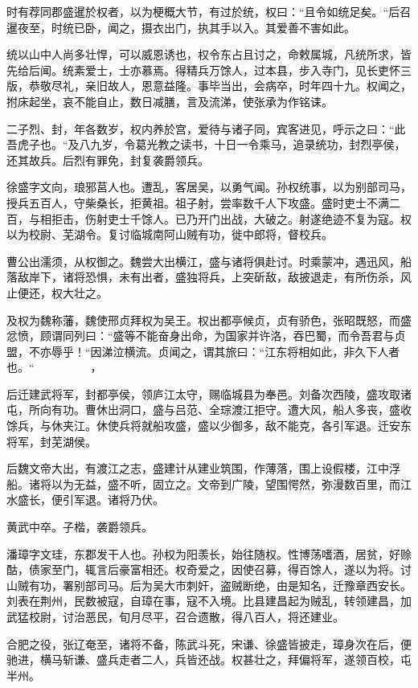 \documentclass[12pt,UTF8]{ctexbook}
\begin{document}
时有荐同郡盛暹於权者，以为梗概大节，有过於统，权曰：“且令如统足矣。“后召暹夜至，时统已卧，闻之，摄衣出门，执其手以入。其爱善不害如此。

统以山中人尚多壮悍，可以威恩诱也，权令东占且讨之，命敕属城，凡统所求，皆先给后闻。统素爱士，士亦慕焉。得精兵万馀人，过本县，步入寺门，见长吏怀三版，恭敬尽礼，亲旧故人，恩意益隆。事毕当出，会病卒，时年四十九。权闻之，拊床起坐，哀不能自止，数日减膳，言及流涕，使张承为作铭诔。

二子烈、封，年各数岁，权内养於宫，爱待与诸子同，宾客进见，呼示之曰：“此吾虎子也。“及八九岁，令葛光教之读书，十日一令乘马，追录统功，封烈亭侯，还其故兵。后烈有罪免，封复袭爵领兵。

徐盛字文向，琅邪莒人也。遭乱，客居吴，以勇气闻。孙权统事，以为别部司马，授兵五百人，守柴桑长，拒黄祖。祖子射，尝率数千人下攻盛。盛时吏士不满二百，与相拒击，伤射吏士千馀人。已乃开门出战，大破之。射遂绝迹不复为寇。权以为校尉、芜湖令。复讨临城南阿山贼有功，徙中郎将，督校兵。

曹公出濡须，从权御之。魏尝大出横江，盛与诸将俱赴讨。时乘蒙冲，遇迅风，船落敌岸下，诸将恐惧，未有出者，盛独将兵，上突斫敌，敌披退走，有所伤杀，风止便还，权大壮之。

及权为魏称藩，魏使邢贞拜权为吴王。权出都亭候贞，贞有骄色，张昭既怒，而盛忿愤，顾谓同列曰：“盛等不能奋身出命，为国家并许洛，吞巴蜀，而令吾君与贞盟，不亦辱乎！“因涕泣横流。贞闻之，谓其旅曰：“江东将相如此，非久下人者也。“　　　　　，

后迁建武将军，封都亭侯，领庐江太守，赐临城县为奉邑。刘备次西陵，盛攻取诸屯，所向有功。曹休出洞口，盛与吕范、全琮渡江拒守。遭大风，船人多丧，盛收馀兵，与休夹江。休使兵将就船攻盛，盛以少御多，敌不能克，各引军退。迁安东将军，封芜湖侯。

后魏文帝大出，有渡江之志，盛建计从建业筑围，作薄落，围上设假楼，江中浮船。诸将以为无益，盛不听，固立之。文帝到广陵，望围愕然，弥漫数百里，而江水盛长，便引军退。诸将乃伏。

黄武中卒。子楷，袭爵领兵。

潘璋字文珪，东郡发干人也。孙权为阳羡长，始往随权。性博荡嗜酒，居贫，好赊酤，债家至门，辄言后豪富相还。权奇爱之，因使召募，得百馀人，遂以为将。讨山贼有功，署别部司马。后为吴大巿刺奸，盗贼断绝，由是知名，迁豫章西安长。刘表在荆州，民数被寇，自璋在事，寇不入境。比县建昌起为贼乱，转领建昌，加武猛校尉，讨治恶民，旬月尽平，召合遗散，得八百人，将还建业。

合肥之役，张辽奄至，诸将不备，陈武斗死，宋谦、徐盛皆披走，璋身次在后，便驰进，横马斩谦、盛兵走者二人，兵皆还战。权甚壮之，拜偏将军，遂领百校，屯半州。
\end{document}
